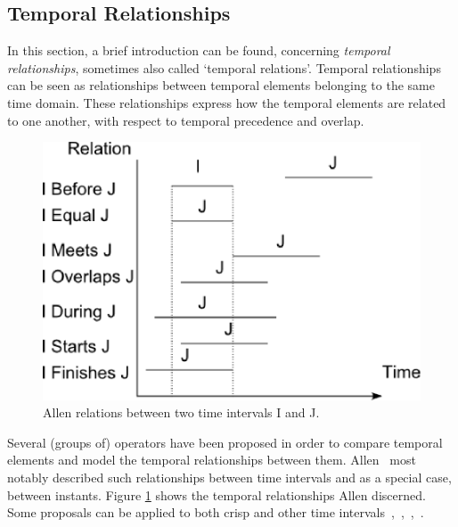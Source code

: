 \subsection{\label{allen-crisp}Temporal Relationships}
In this section, a brief introduction can be found, concerning \emph{temporal relationships}, sometimes also called `temporal relations'\cite{Billiet:Pons:Matthe:DeTre:Pons:2011:BipolarFuzzy}. Temporal relationships can be seen as relationships between temporal elements belonging to the same time domain. These relationships express how the temporal elements are related to one another, with respect to temporal precedence and overlap.

\def\JPicScale{0.5}
\begin{figure}[h]
\centering
\includegraphics[scale=0.5]{graphs/allen.eps}
\caption{Allen relations between two time intervals I and J.}
\label{fig:allen}
\end{figure}

Several (groups of) operators have been proposed in order to compare temporal elements and model the temporal relationships between them. Allen~\cite{Allen83} most notably described such relationships between time intervals and as a special case, between instants. Figure \ref{fig:allen} shows the temporal relationships Allen discerned. Some proposals can be applied to both crisp and other time intervals~\cite{ohlbach2004},~\cite{nagypal2003},~\cite{schockaert08},~\cite{garrido2009}.

